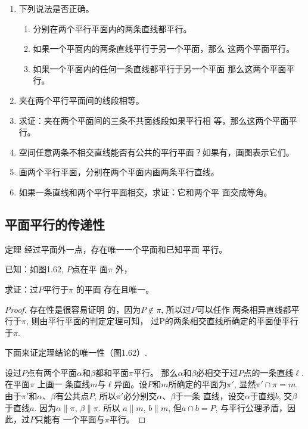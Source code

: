 \begin{ex}
\begin{enumerate}
  \item 下列说法是否正确。
\begin{enumerate}
  \item 分别在两个平行平面内的两条直线都平行。
  \item 如果一个平面内的两条直线平行于另一个平面，那么
    这两个平面平行。
    \item 如果一个平面内的任何一条直线都平行于另一个平面
    那么这两个平面平行。
\end{enumerate}

  \item 夹在两个平行平面间的线段相等。
  \item 求证：夹在两个平面间的三条不共面线段如果平行相
  等，那么这两个平面平行。
  \item 空间任意两条不相交直线能否有公共的平行平面？如果有，画图表示它们。
  \item 画两个平行平面，分别在两个平面内画两条平行直线。
  \item 如果一条直线和两个平行平面相交，求证：它和两个平
  面交成等角。
\end{enumerate}
  \end{ex}

\subsection{平面平行的传递性}

\begin{blk}
  {定理} 经过平面外一点，存在唯一一个平面和已知平面
平行。
\end{blk}

已知：如图1.62, $P$点在平
面$\pi$ 外，

求证：过$P$平行于$\pi$ 的平面
存在且唯一。

\begin{proof}
存在性是很容易证明
的，因为$P\notin \pi$, 所以过$P$可以任作
两条相异直线都平行于$\pi$, 则由平行平面的判定定理可知，
过P的两条相交直线所确定的平面便平行于$\pi$.

下面来证定理结论的唯一性（图1.62）.

设过$P$点有两个平面$\alpha$和$\beta$都和平面$\pi$平行。
那么$\alpha$和$\beta$必相交于过$P$点的一条直线$\ell$. 在平面$\pi$ 上画一
条直线$m$与$\ell$异面。设$P$和$m$所确定的平面为$\pi'$, 显然$\pi'\cap \pi=m$. 由于$\pi'$和$\alpha$、$\beta$有公共点$P$, 所以$\pi'$必分别交$\alpha$、$\beta$于一条
直线，设交$\alpha$于直线$b$, 交$\beta$于直线$a$. 因为$\alpha\parallel \pi$, $\beta\parallel \pi$. 所以
$a\parallel m$, $b\parallel m$, 但$a\cap b=P$, 与平行公理矛盾，因此，过$P$只能有
一个平面与$\pi$平行。
\end{proof}

